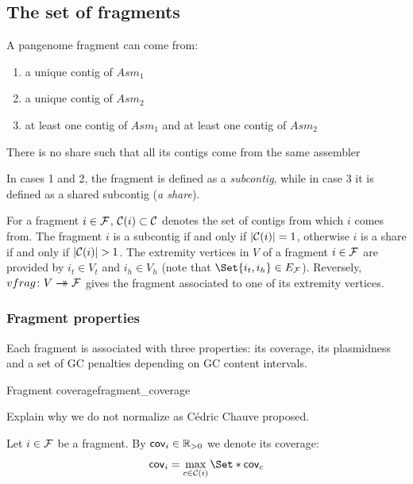 \subsection{The set of fragments}

A pangenome fragment can come from:

\begin{enumerate}
  \item a unique contig of \(Asm_1\)

  \item a unique contig of \(Asm_2\)

  \item at least one contig of \(Asm_1\) and at least one contig of \(Asm_2\)
\end{enumerate}

\begin{missingproofbox}
  There is no share such that all its contigs come from the same assembler
\end{missingproofbox}

In cases 1 and 2, the fragment is defined as a \emph{subcontig}, while in case 3 it is defined as a shared subcontig (\emph{a share}).

For a fragment \(i \in \mathcal{F}{}\), \(\mathcal{C}{}(i) \subset \mathcal{C}{}\) denotes the set of contigs from which \(i\) comes from. The fragment \(i\) is a subcontig if and only if \(|\mathcal{C}{}(i)| = 1\), otherwise \(i\) is a share if and only if \(|\mathcal{C}{}(i)| > 1\).
The extremity vertices in \(V\) of a fragment \(i \in \mathcal{F}{}\) are provided by \(i_t \in V_t\) and \(i_h \in V_h\) (note that \(\Set{i_t, i_h} \in \EFrags{}\)). Reversely, \(vfrag \colon V \rightarrow\mathrel{\mspace{-15mu}}\rightarrow \mathcal{F}{}\) gives the fragment associated to one of its extremity vertices.

\subsubsection{Fragment properties}

Each fragment is associated with three properties: its coverage, its plasmidness and a set of GC penalties depending on GC content intervals.

\begin{definition}{Fragment coverage}{fragment_coverage}
  \begin{todobox}
    Explain why we do not normalize as Cédric Chauve proposed.
  \end{todobox}
  Let \(i \in \mathcal{F}{}\) be a fragment.
  By \(\mathsf{cov}_{i} \in \mathbb{R}{}_{>0}\) we denote its coverage:
  \[
    \cov{i} = \max_{c \in \Contigs{}(i)}\Set*{\cov{c}}
  \]
\end{definition}

